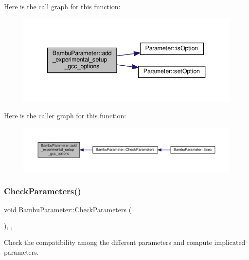 Here is the call graph for this function\+:
\nopagebreak
\begin{figure}[H]
\begin{center}
\leavevmode
\includegraphics[width=340pt]{d4/d67/classBambuParameter_a28ac4c15cb64b71afc19f96caecd9c26_cgraph}
\end{center}
\end{figure}
Here is the caller graph for this function\+:
\nopagebreak
\begin{figure}[H]
\begin{center}
\leavevmode
\includegraphics[width=350pt]{d4/d67/classBambuParameter_a28ac4c15cb64b71afc19f96caecd9c26_icgraph}
\end{center}
\end{figure}
\mbox{\label{classBambuParameter_aa1f5172814a5b7937b261509db53da9d}} 
\subsubsection{\texorpdfstring{Check\+Parameters()}{CheckParameters()}}
{\footnotesize\ttfamily void Bambu\+Parameter\+::\+Check\+Parameters (\begin{DoxyParamCaption}{ }\end{DoxyParamCaption})\hspace{0.3cm}{\ttfamily [override]}, {\ttfamily [private]}, {\ttfamily [virtual]}}



Check the compatibility among the different parameters and compute implicated parameters. 

